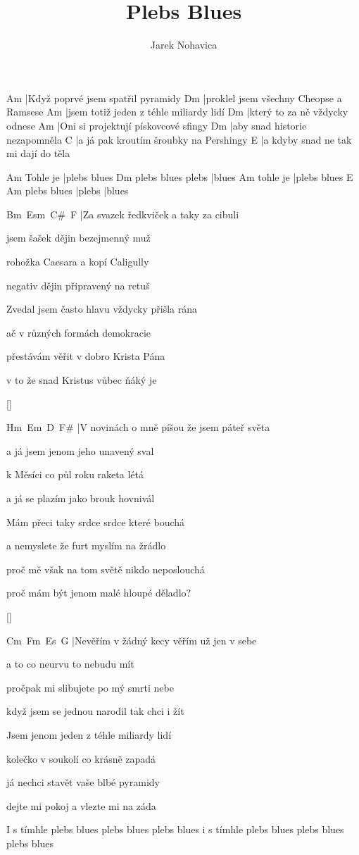 \documentclass{song}
\title{Plebs Blues}
\author{Jarek Nohavica}
\begin{document}
\begin{multicols}{2}

\strophe
Am
|Když poprvé jsem spatřil pyramidy
Dm
|proklel jsem všechny Cheopse a Ramsese
Am
|jsem totiž jeden z téhle miliardy lidí
Dm
|který to za ně vždycky odnese
Am
|Oni si projektují pískovcové sfingy
Dm
|aby snad historie nezapomněla
C
|a já pak kroutím šroubky na Pershingy
E\7
|a kdyby snad ne tak mi dají do těla
\endstrophe

         Am
Tohle je |plebs blues
                  Dm
plebs blues plebs |blues
         Am
tohle je |plebs blues
            E\7    Am
plebs blues |plebs |blues
\endstrophe


\strophe
Bm\ Esm\ C\#\ F\7
|Za svazek ředkviček a taky za cibuli

jsem šašek dějin bezejmenný muž

rohožka Caesara a kopí Caligully

negativ dějin připravený na retuš

Zvedal jsem často hlavu vždycky přišla rána

ač v různých formách demokracie

přestávám věřit v dobro Krista Pána

v to že snad Kristus vůbec ňáký je
\endstrophe

\ref{}

\columnbreak

\strophe
Hm\ Em\ D\ F\#\7
|V novinách o mně píšou že jsem páteř světa

a já jsem jenom jeho unavený sval

k Měsíci co půl roku raketa létá

a já se plazím jako brouk hovnivál

Mám přeci taky srdce srdce které bouchá

a nemyslete že furt myslím na žrádlo

proč mě však na tom světě nikdo neposlouchá

proč mám být jenom malé hloupé děladlo?
\endstrophe

\ref{}

\strophe
Cm\ Fm\ Es\ G\7
|Nevěřím v žádný kecy věřím už jen v sebe

a to co neurvu to nebudu mít

pročpak mi slibujete po mý smrti nebe

když jsem se jednou narodil tak chci i žít

Jsem jenom jeden z téhle miliardy lidí

kolečko v soukolí co krásně zapadá

já nechci stavět vaše blbé pyramidy

dejte mi pokoj a vlezte mi na záda
\endstrophe

I s tímhle plebs blues
plebs blues plebs blues
i s tímhle plebs blues
plebs blues plebs blues
\endstrophe

\end{multicols}
\end{document}
